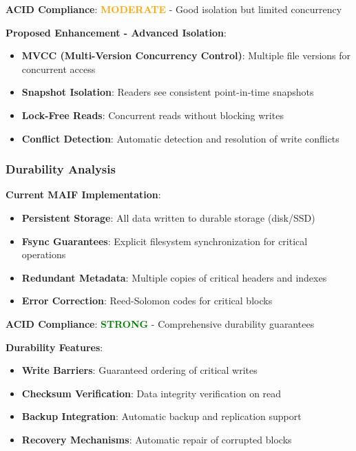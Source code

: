 \documentclass[conference]{IEEEtran}
\begin{document}
\begin{itemize}[leftmargin=*]
\textbf{ACID Compliance}: \textcolor{orange}{\textbf{MODERATE}} - Good isolation but limited concurrency

\textbf{Proposed Enhancement - Advanced Isolation}:
\begin{itemize}[leftmargin=*]
\item \textbf{MVCC (Multi-Version Concurrency Control)}: Multiple file versions for concurrent access
\item \textbf{Snapshot Isolation}: Readers see consistent point-in-time snapshots
\item \textbf{Lock-Free Reads}: Concurrent reads without blocking writes
\item \textbf{Conflict Detection}: Automatic detection and resolution of write conflicts
\end{itemize}

\subsubsection{Durability Analysis}

\textbf{Current MAIF Implementation}:
\begin{itemize}[leftmargin=*]
\item \textbf{Persistent Storage}: All data written to durable storage (disk/SSD)
\item \textbf{Fsync Guarantees}: Explicit filesystem synchronization for critical operations
\item \textbf{Redundant Metadata}: Multiple copies of critical headers and indexes
\item \textbf{Error Correction}: Reed-Solomon codes for critical blocks
\end{itemize}

\textbf{ACID Compliance}: \textcolor{green}{\textbf{STRONG}} - Comprehensive durability guarantees

\textbf{Durability Features}:
\begin{itemize}[leftmargin=*]
\item \textbf{Write Barriers}: Guaranteed ordering of critical writes
\item \textbf{Checksum Verification}: Data integrity verification on read
\item \textbf{Backup Integration}: Automatic backup and replication support
\item \textbf{Recovery Mechanisms}: Automatic repair of corrupted blocks
\end{itemize}


\end{itemize}
\end{document}
